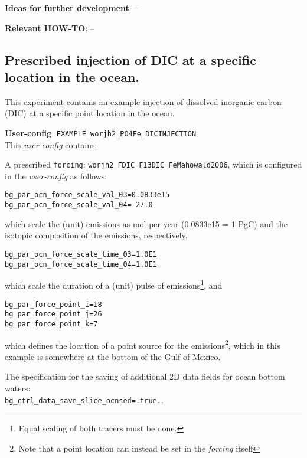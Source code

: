 \documentclass[10pt,twoside]{article}
\begin{document}
\noindent \textbf{Ideas for further development}: --

\noindent \textbf{Relevant HOW-TO}: --


\subsection{Prescribed injection of DIC at a specific location in the ocean.}\label{EXAMPLE_worjh2_PO4Fe_DICINJECTION}

This experiment contains an example injection of dissolved inorganic carbon (DIC) at a specific point location  in the ocean.

\noindent \textbf{User-config}: \texttt{EXAMPLE\_worjh2\_PO4Fe\_DICINJECTION}
\\ This \textit{user-config} contains:
\begin{compactitem}
        \item A prescribed \texttt{forcing}: \texttt{worjh2\_FDIC\_F13DIC\_FeMahowald2006}, which is configured in the \textit{user-config} as follows:
\begin{compactenum}
        \item 
        \begin{verbatim}
bg_par_ocn_force_scale_val_03=0.0833e15
bg_par_ocn_force_scale_val_04=-27.0
                \end{verbatim}
                which scale the (unit) emissions as mol per year (0.0833e15 = 1 PgC) and the isotopic composition of the emissions, respectively,
        \item 
        \begin{verbatim}
bg_par_ocn_force_scale_time_03=1.0E1
bg_par_ocn_force_scale_time_04=1.0E1
                \end{verbatim}
                which scale the duration of a (unit) pulse of emissions\footnote{Equal scaling of both tracers must be done.}, and
        \item 
        \begin{verbatim}
bg_par_force_point_i=18
bg_par_force_point_j=26
bg_par_force_point_k=7
                \end{verbatim}
                which defines the location of a point source for the emissions\footnote{Note that a point location can instead be set in the \textit{forcing} itself}, which in this example is somewhere at the bottom of the Gulf of Mexico.
\end{compactenum}
\item The specification for the saving of additional 2D data fields for ocean bottom waters: 
\\ \texttt{bg\_ctrl\_data\_save\_slice\_ocnsed=.true.}.
\end{compactitem}
\end{document}
